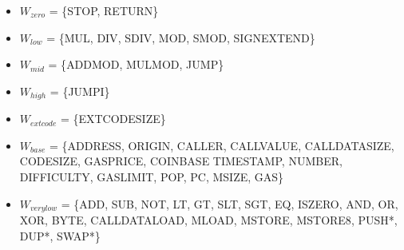 \begin{center}
\begin{longtabu}
  \bottomrule
  \end{longtabu}
  \begin{multicols}{2}
    \begin{itemize}[label=,leftmargin=0mm,topsep=0mm,itemsep=0em]
      \scriptsize
      \item $W_{zero}$ = \tiny\{{STOP}, {RETURN}\}
      \scriptsize
      \item $W_{low}$ = \tiny\{{MUL}, {DIV}, {SDIV}, {MOD}, {SMOD}, {SIGNEXTEND}\}
      \scriptsize
      \item $W_{mid}$ = \tiny\{{ADDMOD}, {MULMOD}, {JUMP}\}
      \scriptsize
      \item $W_{high}$ = \tiny\{{JUMPI}\}
      \scriptsize
      \item $W_{extcode}$ = \tiny\{{EXTCODESIZE}\}
      \scriptsize
      \item $W_{base}$ = \tiny\{{ADDRESS}, {ORIGIN}, {CALLER}, {CALLVALUE},
        {CALLDATASIZE}, {CODESIZE}, {GASPRICE}, {COINBASE} {TIMESTAMP},
        {NUMBER}, {DIFFICULTY}, {GASLIMIT}, {POP}, {PC}, {MSIZE}, {GAS}\}
      \scriptsize
      \item $W_{verylow}$ = \tiny\{{ADD}, {SUB}, {NOT}, {LT}, {GT}, {SLT},
        {SGT}, {EQ}, {ISZERO}, {AND}, {OR}, {XOR}, {BYTE}, {CALLDATALOAD},
        {MLOAD}, {MSTORE}, {MSTORE8}, {PUSH*}, {DUP*}, {SWAP*}\}
    \end{itemize}
  \end{multicols}
\end{center}

